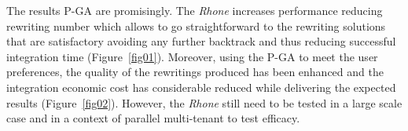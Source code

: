 The results P-GA are promisingly.  
The \textit{Rhone} increases performance reducing rewriting number which allows to go straightforward to the rewriting solutions that are satisfactory avoiding any further backtrack and thus reducing successful integration time (Figure~\ref{fig01}). Moreover, using the P-GA to meet the user preferences, the quality of the rewritings produced has been enhanced and the integration economic cost has considerable reduced while delivering the expected results (Figure~\ref{fig02}). However, the \textit{Rhone} still need to be tested in a large scale case and in a context of parallel multi-tenant to test efficacy.